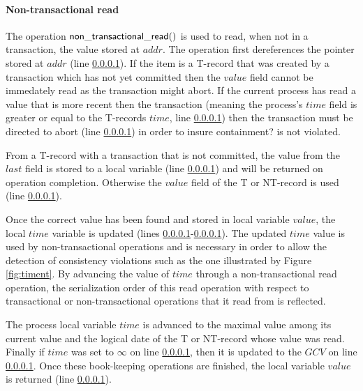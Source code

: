 \documentclass[11pt,letterpaper]{article}
\begin{document}
\paragraph{Non-transactional read}
The   operation  ${\sf   non\_transactional\_read()}$  is   used   to  read,
when not in a transaction, the value stored at
$\mathit{addr}$.
The  operation first  dereferences  the pointer  stored at  $\mathit{addr}$
(line \ref{}).
If the item is a T-record that was created by a 
transaction which  has not yet  committed then the $\mathit{value}$ field
cannot be immedately read as the transaction might abort.
If the current process has read a value that is more recent then the transaction
(meaning the process's $\mathit{time}$ field is greater or equal to the T-records
$\mathit{time}$, line \ref{}) then the transaction must be directed to abort (line \ref{})
in order to insure containment? is not violated.

From a T-record with a transaction that is not committed, the value from the $\mathit{last}$
field is stored to a local variable (line \ref{}) and will be returned on operation completion.
Otherwise the $\mathit{value}$ field of the T or NT-record is used (line \ref{}).

Once  the correct value  has been  found  and stored  in local  variable 
$\mathit{value}$, the local $\mathit{time}$   
variable  is updated  (lines \ref{}-\ref{}).  The updated  $\mathit{time}$
value is used by non-transactional operations and is necessary in order to allow 
the detection of consistency 
violations such as the one illustrated by Figure \ref{fig:timent}. 
By advancing the value of $\mathit{time}$ 
through a non-transactional read operation, 
the serialization order of this read operation with 
respect to transactional or non-transactional operations 
that it read from is reflected.

The process local variable $\mathit{time}$ is advanced to 
the maximal 
value among its current 
value and the logical date of the T or NT-record whose value was read.
Finally if $\mathit{time}$ was set to $\infty$ on line \ref{}, then it is updated
to the $\mathit{GCV}$ on line \ref{}.
Once these book-keeping 
operations are finished, the local variable $\mathit{value}$
is returned (line \ref{}).
\end{document}
